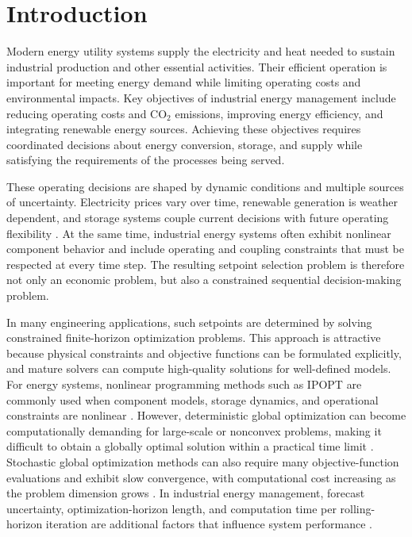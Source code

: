 \documentclass[12pt]{article}
\begin{document}
\section{Introduction}
\label{Section1}

Modern energy utility systems supply the electricity and heat needed to sustain industrial production and other essential activities. Their efficient operation is important for meeting energy demand while limiting operating costs and environmental impacts. Key objectives of industrial energy management include reducing operating costs and CO$_2$ emissions, improving energy efficiency, and integrating renewable energy sources. Achieving these objectives requires coordinated decisions about energy conversion, storage, and supply while satisfying the requirements of the processes being served.

These operating decisions are shaped by dynamic conditions and multiple sources of uncertainty. Electricity prices vary over time, renewable generation is weather dependent, and storage systems couple current decisions with future operating flexibility \cite{khalid2024smart}. At the same time, industrial energy systems often exhibit nonlinear component behavior and include operating and coupling constraints that must be respected at every time step. The resulting setpoint selection problem is therefore not only an economic problem, but also a constrained sequential decision-making problem.

In many engineering applications, such setpoints are determined by solving constrained finite-horizon optimization problems. This approach is attractive because physical constraints and objective functions can be formulated explicitly, and mature solvers can compute high-quality solutions for well-defined models. For energy systems, nonlinear programming methods such as IPOPT \cite{wachter2006implementation} are commonly used when component models, storage dynamics, and operational constraints are nonlinear \cite{walden2023nonlinear}. However, deterministic global optimization can become computationally demanding for large-scale or nonconvex problems, making it difficult to obtain a globally optimal solution within a practical time limit \cite{lin2012deterministic}. Stochastic global optimization methods can also require many objective-function evaluations and exhibit slow convergence, with computational cost increasing as the problem dimension grows \cite{zhigljavsky2008stochastic}. In industrial energy management, forecast uncertainty, optimization-horizon length, and computation time per rolling-horizon iteration are additional factors that influence system performance \cite{kyriakidis2025energy}.
\end{document}
